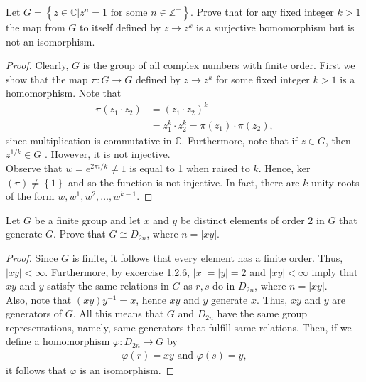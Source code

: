\documentclass[12pt]{article}
\newcommand{\Z}{\mathbb{Z}}
\newenvironment{problem}[2][Problem]{\begin{trivlist} \item[\hskip \labelsep {\bfseries #1}\hskip \labelsep {\bfseries #2.}]}{\end{trivlist}}
\begin{document}
\begin{problem}{19}
  Let $G= \left\{ z\in \mathbb{C} | z^{n} = 1 \text{ for some } n\in \Z^{+} \right\}$. Prove that for any fixed integer $k>1$ the map from $G$ to itself defined by $z\to z^{k}$ is a surjective homomorphism but is not an isomorphism.
  \begin{proof}
  Clearly, $G$ is the group of all complex numbers with finite order. First we show that the map $\pi: G\to G$ defined by $z\to z^{k}$ for some fixed integer $k>1$ is a homomorphism. Note that
\begin{align*}
  \pi(z_{1}\cdot z_{2}) &= \left( z_{1}\cdot z_{2} \right)^{k}\\
  &= z_{1}^{k}\cdot z_{2}^{k} = \pi(z_{1})\cdot \pi(z_{2}),
\end{align*}
since multiplication is commutative in $\mathbb{C}$. Furthermore, note that if $z\in G$, then $z^{1/k}\in G$ . However, it is not injective.\\

Observe that $w=e^{2\pi i/k} \neq 1$ is equal to 1 when raised to $k$. Hence, ker$(\pi) \neq \left\{ 1 \right\}$ and so the function is not injective. In fact, there are $k$ unity roots of the form $w, w^{1}, w^{2},\dots,w^{k-1}$.
\end{proof}
\end{problem}
\begin{problem}{24}
  Let $G$ be a finite group and let $x$ and $y$ be distinct elements of order 2 in $G$ that generate $G$. Prove that $G\cong D_{2n}$, where $n=|xy|$. 
\begin{proof}
  Since $G$ is finite, it follows that every element has a finite order. Thus, $|xy|<\infty$. Furthermore, by excercise 1.2.6, $|x|=|y|=2$ and $|xy|<\infty$ imply that $xy$ and $y$ satisfy the same relations in $G$ as $r,s$ do in $D_{2n}$, where $n=|xy|$. \\
  Also, note that $(xy)y^{-1} =x$, hence $xy$ and $y$ generate $x$. Thus, $xy$ and $y$ are generators of $G$. All this means that $G$ and $D_{2n}$ have the same group representations, namely, same generators that fulfill same relations. Then, if we define a homomorphism $\varphi: D_{2n}\to G$ by
\begin{align*}
  \varphi(r) = xy \text{ and } \varphi(s) = y, 
\end{align*}
it follows that $\varphi$ is an isomorphism.
\end{proof}
\end{problem}
       
\end{document}
